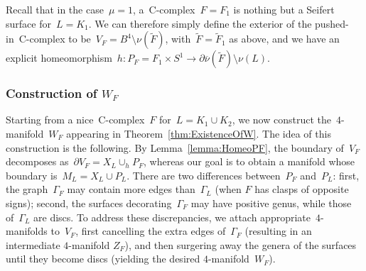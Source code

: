 \documentclass[10.9pt,a4paper]{amsart}
\theoremstyle{definition}
\theoremstyle{remark}
\newcommand{\onu}{\overline{\nu}}
\begin{document}
\medskip


Recall that in the case~$\mu=1$, a~C-complex~$F=F_1$ is nothing but a Seifert surface for~$L=K_1$.
We can therefore simply define the exterior of the pushed-in~C-complex to be~$V_F=B^4\setminus\nu(\tilde{F})$,
with~$\tilde{F}=\tilde{F}_1$ as above, and we have an explicit homeomorphism~$h\colon P_F=F_1\times S^1\to \partial\onu(\tilde{F})\setminus\nu(L)$.


\subsubsection*{Construction of $W_F$}
Starting from a nice~C-complex~$F$ for~$L=K_1\cup K_2$, we now construct the~$4$-manifold~$W_F$ appearing in Theorem~\ref{thm:ExistenceOfW}.  
The idea of this construction is the following.
By Lemma~\ref{lemma:HomeoPF}, the boundary of~$V_F$ decomposes as~$\partial V_F = X_L \cup_h P_F$, whereas our goal is to obtain a manifold whose boundary is~$M_L=X_L \cup P_L$.
There are two differences between~$P_F$ and~$P_L$: first, the graph~$\Gamma_F$ may contain more edges than~$\Gamma_L$ (when $F$ has clasps of opposite signs); second, the surfaces decorating~$\Gamma_F$ may have positive genus, while those of~$\Gamma_L$ are discs. 
To address these discrepancies, we attach appropriate~$4$-manifolds to~$V_F$, first cancelling the extra edges of~$\Gamma_F$ (resulting in an intermediate $4$-manifold $Z_F$), and then surgering away the genera of the surfaces until they become discs (yielding the desired $4$-manifold~$W_F$).

\medskip
\end{document}
